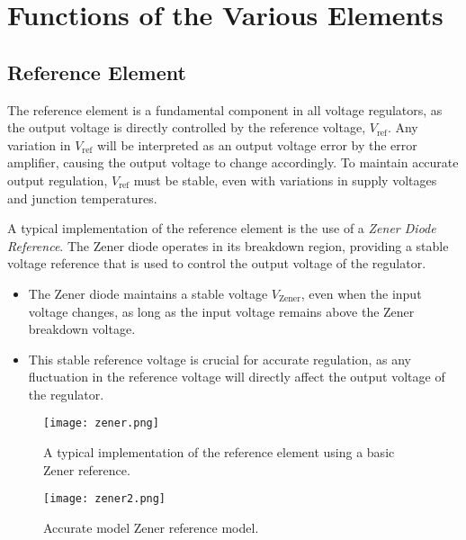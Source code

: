 \documentclass[a4paper,9pt,twoside,openany,twocolumn]{memoir}
\begin{document}
\section{Functions of the Various Elements}

\subsection{Reference Element}

The reference element is a fundamental component in all voltage regulators, as the output voltage is directly controlled by the reference voltage, \( V_{\text{ref}} \). Any variation in \( V_{\text{ref}} \) will be interpreted as an output voltage error by the error amplifier, causing the output voltage to change accordingly. To maintain accurate output regulation, \( V_{\text{ref}} \) must be stable, even with variations in supply voltages and junction temperatures.

A typical implementation of the reference element is the use of a \textit{Zener Diode Reference}. The Zener diode operates in its breakdown region, providing a stable voltage reference that is used to control the output voltage of the regulator.

\begin{itemize}
    \item The Zener diode maintains a stable voltage \( V_{\text{Zener}} \), even when the input voltage changes, as long as the input voltage remains above the Zener breakdown voltage.
    \item This stable reference voltage is crucial for accurate regulation, as any fluctuation in the reference voltage will directly affect the output voltage of the regulator.
\end{itemize}
\begin{figure}[H] %
    \centering
    \texttt{[image: zener.png]} %
    \caption{A typical implementation of the reference element using a basic Zener reference.}
    \label{fig:zener-reference} %
\end{figure}
\begin{figure}[H] %
    \centering
    \texttt{[image: zener2.png]} %
    \caption{Accurate model Zener reference model.}
    \label{fig:accurate-zener-reference} %
\end{figure}
\end{document}

